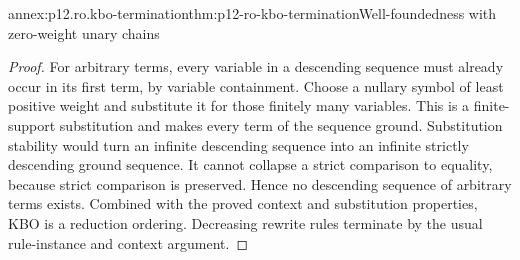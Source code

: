 \begin{annexitem}{annex:p12.ro.kbo-termination}{thm:p12-ro-kbo-termination}{Well-foundedness with zero-weight unary chains}
\begin{proof}
For arbitrary terms, every variable in a descending sequence must
already occur in its first term, by variable containment. Choose a
nullary symbol of least positive weight and substitute it for those
finitely many variables. This is a finite-support substitution and
makes every term of the sequence ground. Substitution stability would turn
an infinite descending sequence into an infinite strictly descending
ground sequence. It cannot collapse a strict comparison to equality,
because strict comparison is preserved. Hence no descending sequence
of arbitrary terms exists. Combined with the proved context and
substitution properties, KBO is a reduction ordering. Decreasing
rewrite rules terminate by the usual rule-instance and context argument.
\end{proof}
\end{annexitem}

